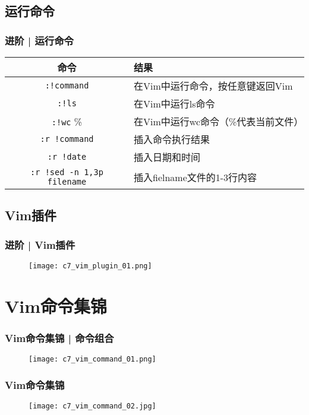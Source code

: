 \subsection{运行命令}
\begin{frame}[fragile]
  \frametitle{进阶 | \alert{运行命令}}
  \begin{table}
    \centering
    \begin{tabularx}{\textwidth}{cX}
      \hline
      \rowcolor{blue!50}命令 & 结果\\
      \hline
      \verb|:!command| & 在Vim中运行命令，按任意键返回Vim\\
      \verb|:!ls| & 在Vim中运行ls命令\\
      \hline
      \verb|:!wc| \% & 在Vim中运行wc命令（\%代表当前文件）\\
      \hline
      \verb|:r !command| & 插入命令执行结果\\
      \verb|:r !date| & 插入日期和时间\\
      \verb|:r !sed -n 1,3p filename| & 插入fielname文件的1-3行内容\\
      \hline
    \end{tabularx}
  \end{table}
\end{frame}

\subsection{Vim插件}
\begin{frame}
  \frametitle{进阶 | Vim插件}
  \begin{figure}
    \centering
    \texttt{[image: c7\_vim\_plugin\_01.png]}
  \end{figure}
\end{frame}

\section{Vim命令集锦}
\begin{frame}
  \frametitle{Vim命令集锦 | 命令组合}
  \begin{figure}
    \centering
    \texttt{[image: c7\_vim\_command\_01.png]}
  \end{figure}
\end{frame}

\begin{frame}
  \frametitle{Vim命令集锦}
  \begin{figure}
    \centering
    \texttt{[image: c7\_vim\_command\_02.jpg]}
  \end{figure}
\end{frame}

